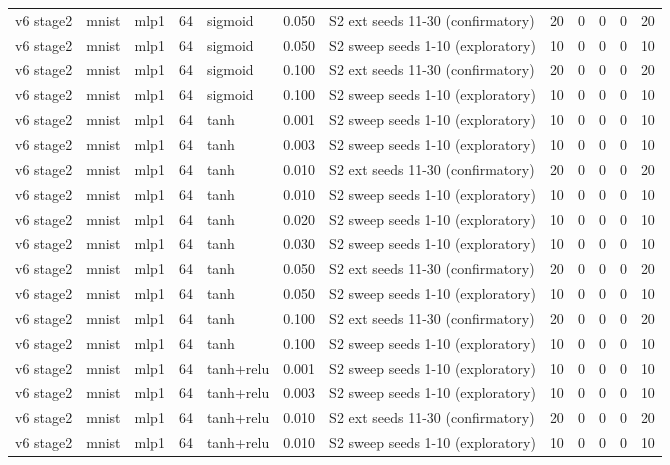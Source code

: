 \begin{table}[htbp]
{\begin{tabular}{@{}lllrlrlrrrrr@{}}
v6 stage2 & mnist & mlp1 & 64 & sigmoid & 0.050 & S2 ext seeds 11-30 (confirmatory) & 20 & 0 & 0 & 0 & 20 \\
v6 stage2 & mnist & mlp1 & 64 & sigmoid & 0.050 & S2 sweep seeds 1-10 (exploratory) & 10 & 0 & 0 & 0 & 10 \\
v6 stage2 & mnist & mlp1 & 64 & sigmoid & 0.100 & S2 ext seeds 11-30 (confirmatory) & 20 & 0 & 0 & 0 & 20 \\
v6 stage2 & mnist & mlp1 & 64 & sigmoid & 0.100 & S2 sweep seeds 1-10 (exploratory) & 10 & 0 & 0 & 0 & 10 \\
v6 stage2 & mnist & mlp1 & 64 & tanh & 0.001 & S2 sweep seeds 1-10 (exploratory) & 10 & 0 & 0 & 0 & 10 \\
v6 stage2 & mnist & mlp1 & 64 & tanh & 0.003 & S2 sweep seeds 1-10 (exploratory) & 10 & 0 & 0 & 0 & 10 \\
v6 stage2 & mnist & mlp1 & 64 & tanh & 0.010 & S2 ext seeds 11-30 (confirmatory) & 20 & 0 & 0 & 0 & 20 \\
v6 stage2 & mnist & mlp1 & 64 & tanh & 0.010 & S2 sweep seeds 1-10 (exploratory) & 10 & 0 & 0 & 0 & 10 \\
v6 stage2 & mnist & mlp1 & 64 & tanh & 0.020 & S2 sweep seeds 1-10 (exploratory) & 10 & 0 & 0 & 0 & 10 \\
v6 stage2 & mnist & mlp1 & 64 & tanh & 0.030 & S2 sweep seeds 1-10 (exploratory) & 10 & 0 & 0 & 0 & 10 \\
v6 stage2 & mnist & mlp1 & 64 & tanh & 0.050 & S2 ext seeds 11-30 (confirmatory) & 20 & 0 & 0 & 0 & 20 \\
v6 stage2 & mnist & mlp1 & 64 & tanh & 0.050 & S2 sweep seeds 1-10 (exploratory) & 10 & 0 & 0 & 0 & 10 \\
v6 stage2 & mnist & mlp1 & 64 & tanh & 0.100 & S2 ext seeds 11-30 (confirmatory) & 20 & 0 & 0 & 0 & 20 \\
v6 stage2 & mnist & mlp1 & 64 & tanh & 0.100 & S2 sweep seeds 1-10 (exploratory) & 10 & 0 & 0 & 0 & 10 \\
v6 stage2 & mnist & mlp1 & 64 & tanh+relu & 0.001 & S2 sweep seeds 1-10 (exploratory) & 10 & 0 & 0 & 0 & 10 \\
v6 stage2 & mnist & mlp1 & 64 & tanh+relu & 0.003 & S2 sweep seeds 1-10 (exploratory) & 10 & 0 & 0 & 0 & 10 \\
v6 stage2 & mnist & mlp1 & 64 & tanh+relu & 0.010 & S2 ext seeds 11-30 (confirmatory) & 20 & 0 & 0 & 0 & 20 \\
v6 stage2 & mnist & mlp1 & 64 & tanh+relu & 0.010 & S2 sweep seeds 1-10 (exploratory) & 10 & 0 & 0 & 0 & 10 \\

\end{tabular}}
\end{table}
